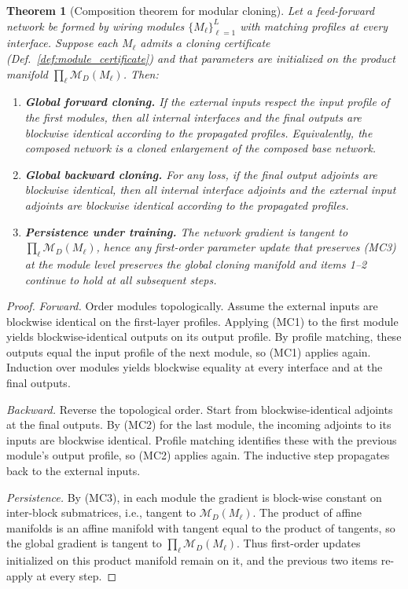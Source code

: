 \documentclass{article}
\newcommand{\ManifoldD}{\mathcal{M}_{D}}
\newtheorem{theorem}{Theorem}[section]
\numberwithin{figure}{section}
\begin{document}
\begin{theorem}[Composition theorem for modular cloning]
\label{thm:modular_composition}
Let a feed-forward network be formed by wiring modules $\{M_\ell\}_{\ell=1}^L$ with matching profiles at every interface. Suppose each $M_\ell$ admits a cloning certificate (Def.~\ref{def:module_certificate}) and that parameters are initialized on the product manifold $\prod_\ell \ManifoldD(M_\ell)$. Then:
\begin{enumerate}[leftmargin=2.1em]
\item \textbf{Global forward cloning.} If the external inputs respect the input profile of the first modules, then all internal interfaces and the final outputs are blockwise identical according to the propagated profiles. Equivalently, the composed network is a cloned enlargement of the composed base network.
\item \textbf{Global backward cloning.} For any loss, if the final output adjoints are blockwise identical, then all internal interface adjoints and the external input adjoints are blockwise identical according to the propagated profiles.
\item \textbf{Persistence under training.} The network gradient is tangent to $\prod_\ell \ManifoldD(M_\ell)$, hence any first-order parameter update that preserves (MC3) at the module level preserves the global cloning manifold and items 1–2 continue to hold at all subsequent steps.
\end{enumerate}
\end{theorem}

\begin{proof}
\emph{Forward.} Order modules topologically. Assume the external inputs are blockwise identical on the first-layer profiles. Applying (MC1) to the first module yields blockwise-identical outputs on its output profile. By profile matching, these outputs equal the input profile of the next module, so (MC1) applies again. Induction over modules yields blockwise equality at every interface and at the final outputs.

\emph{Backward.} Reverse the topological order. Start from blockwise-identical adjoints at the final outputs. By (MC2) for the last module, the incoming adjoints to its inputs are blockwise identical. Profile matching identifies these with the previous module’s output profile, so (MC2) applies again. The inductive step propagates back to the external inputs.

\emph{Persistence.} By (MC3), in each module the gradient is block-wise constant on inter-block submatrices, i.e., tangent to $\ManifoldD(M_\ell)$. The product of affine manifolds is an affine manifold with tangent equal to the product of tangents, so the global gradient is tangent to $\prod_\ell \ManifoldD(M_\ell)$. Thus first-order updates initialized on this product manifold remain on it, and the previous two items re-apply at every step.
\end{proof}
\end{document}
